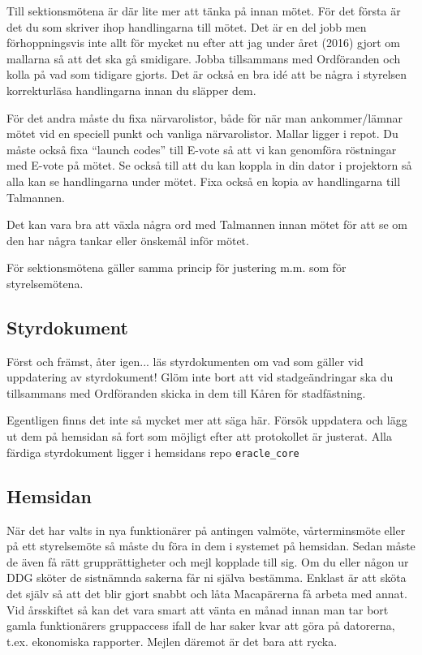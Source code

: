 \documentclass[10pt]{article}
\begin{document}
Till sektionsmötena är där lite mer att tänka på innan mötet. För det första är det du som skriver ihop handlingarna till mötet. Det är en del jobb men förhoppningsvis inte allt för mycket nu efter att jag under året (2016) gjort om mallarna så att det ska gå smidigare. Jobba tillsammans med Ordföranden och kolla på vad som tidigare gjorts. Det är också en bra idé att be några i styrelsen korrekturläsa handlingarna innan du släpper dem.

För det andra måste du fixa närvarolistor, både för när man ankommer/lämnar mötet vid en speciell punkt och vanliga närvarolistor. Mallar ligger i repot. Du måste också fixa ``launch codes'' till E-vote så att vi kan genomföra röstningar med E-vote på mötet. Se också till att du kan koppla in din dator i projektorn så alla kan se handlingarna under mötet. Fixa också en kopia av handlingarna till Talmannen.

Det kan vara bra att växla några ord med Talmannen innan mötet för att se om den har några tankar eller önskemål inför mötet.

För sektionsmötena gäller samma princip för justering m.m. som för styrelsemötena.

\subsection{Styrdokument}
Först och främst, åter igen... läs styrdokumenten om vad som gäller vid uppdatering av styrdokument! Glöm inte bort att vid stadgeändringar ska du tillsammans med Ordföranden skicka in dem till Kåren för stadfästning.

Egentligen finns det inte så mycket mer att säga här. Försök uppdatera och lägg ut dem på hemsidan så fort som möjligt efter att protokollet är justerat. Alla färdiga styrdokument ligger i hemsidans repo \texttt{eracle\_core}

\subsection{Hemsidan}
När det har valts in nya funktionärer på antingen valmöte, vårterminsmöte eller på ett styrelsemöte så måste du föra in dem i systemet på hemsidan. Sedan måste de även få rätt grupprättigheter och mejl kopplade till sig. Om du eller någon ur DDG sköter de sistnämnda sakerna får ni själva bestämma. Enklast är att sköta det själv så att det blir gjort snabbt och låta Macapärerna få arbeta med annat. Vid årsskiftet så kan det vara smart att vänta en månad innan man tar bort gamla funktionärers gruppaccess ifall de har saker kvar att göra på datorerna, t.ex. ekonomiska rapporter. Mejlen däremot är det bara att rycka.
\end{document}
